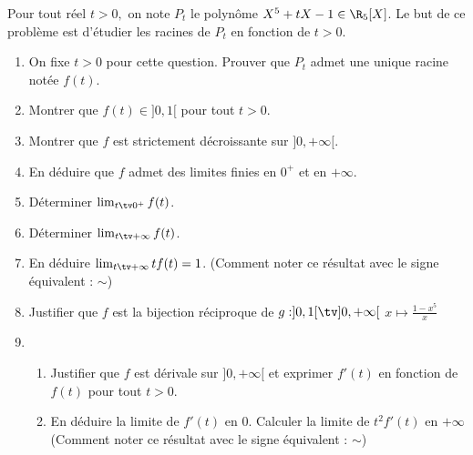 



\begin{exercice}
Pour tout réel $t>0, $ on note $P_t$ le polynôme $X^5 +tX-1 \in \R_5[X]$. Le but de ce problème est d'étudier les racines de $P_t$ en fonction de $t>0$. 
\begin{enumerate}
\item On fixe $t>0$ pour cette question. Prouver que $P_t$ admet une unique racine notée $f(t)$. 
\item Montrer que $f(t) \in ]0,1[$ pour tout $t>0.$
\item Montrer que $f$ est strictement décroissante sur $]0,+\infty[$.
\item En déduire que $f$ admet des limites finies en $0^+$ et en $+\infty$.

\item Déterminer $\lim_{t\tv 0^+} f(t)$. 

\item Déterminer $\lim_{t\tv+\infty} f(t)$. 
\item En déduire  $\lim_{t\tv +\infty} tf(t)= 1$. (Comment noter ce résultat avec le signe équivalent : $\sim$) 

\item Justifier que $f$ est la bijection réciproque de $g : ]0,1[\tv ]0,+\infty[$ 
$x \mapsto\frac{1-x^5}{x}$
\item \begin{enumerate}
\item Justifier que $f$ est dérivale sur $]0,+\infty[ $ et exprimer $f'(t)$ en fonction de $f(t)$ pour tout $t>0$.
\item En déduire la limite de $f'(t)$ en $0$. Calculer la limite de $t^2 f'(t)$ en $+\infty$ (Comment noter ce résultat avec le signe équivalent : $\sim$) 
\end{enumerate}
\end{enumerate}
\end{exercice}

